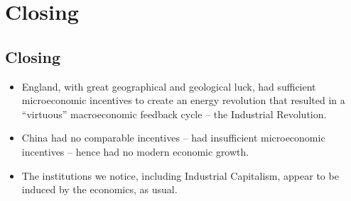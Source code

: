 \documentclass[final]{beamer}
\begin{document}

\section{Closing}

\subsection{Closing}

\begin{frame}
\begin{itemize}
\item England, with great geographical and geological luck, had sufficient microeconomic incentives to create an energy revolution that resulted in a ``virtuous'' macroeconomic feedback cycle -- the Industrial Revolution.
\item China had no comparable incentives -- had insufficient microeconomic incentives -- hence had no modern economic growth.
\item The institutions we notice, including Industrial Capitalism, appear to be induced by the economics, as usual.
\end{itemize}
\end{frame}
\end{document}
